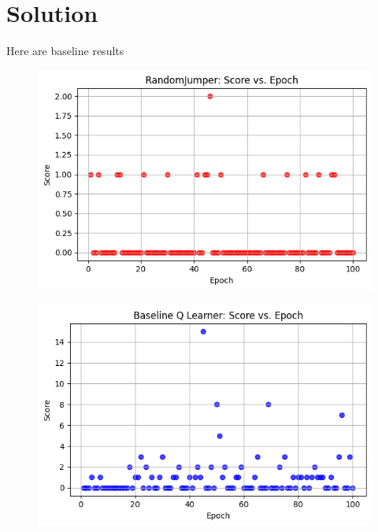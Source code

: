 \documentclass[submit]{../harvardml}
\newenvironment{solution}
  {\color{blue}\section*{Solution}}
{}
\begin{document}
\begin{solution}
Here are baseline results
\begin{figure}[H]
    \centering
    \includegraphics[width=0.5\linewidth]{hw6/img_output/baseline_random.png}
\end{figure}
\begin{figure}[H]
    \centering
    \includegraphics[width=0.5\linewidth]{hw6/img_output/baselineqlearn.png}
\end{figure}


\end{solution}
\end{document}
